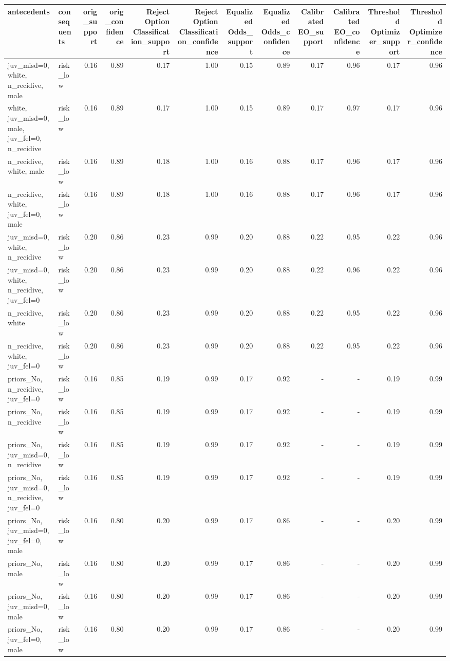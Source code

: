 \begin{tabular}{llrrrrrrrrrr}
\toprule
antecedents & consequents & orig\_support & orig\_confidence & Reject Option Classification\_support & Reject Option Classification\_confidence & Equalized Odds\_support & Equalized Odds\_confidence & Calibrated EO\_support & Calibrated EO\_confidence & Threshold Optimizer\_support & Threshold Optimizer\_confidence \\
\midrule
juv\_misd=0, white, n\_recidive, male & risk\_low & 0.16 & 0.89 & 0.17 & 1.00 & 0.15 & 0.89 & 0.17 & 0.96 & 0.17 & 0.96 \\
white, juv\_misd=0, male, juv\_fel=0, n\_recidive & risk\_low & 0.16 & 0.89 & 0.17 & 1.00 & 0.15 & 0.89 & 0.17 & 0.97 & 0.17 & 0.96 \\
n\_recidive, white, male & risk\_low & 0.16 & 0.89 & 0.18 & 1.00 & 0.16 & 0.88 & 0.17 & 0.96 & 0.17 & 0.96 \\
n\_recidive, white, juv\_fel=0, male & risk\_low & 0.16 & 0.89 & 0.18 & 1.00 & 0.16 & 0.88 & 0.17 & 0.96 & 0.17 & 0.96 \\
juv\_misd=0, white, n\_recidive & risk\_low & 0.20 & 0.86 & 0.23 & 0.99 & 0.20 & 0.88 & 0.22 & 0.95 & 0.22 & 0.96 \\
juv\_misd=0, white, n\_recidive, juv\_fel=0 & risk\_low & 0.20 & 0.86 & 0.23 & 0.99 & 0.20 & 0.88 & 0.22 & 0.96 & 0.22 & 0.96 \\
n\_recidive, white & risk\_low & 0.20 & 0.86 & 0.23 & 0.99 & 0.20 & 0.88 & 0.22 & 0.95 & 0.22 & 0.96 \\
n\_recidive, white, juv\_fel=0 & risk\_low & 0.20 & 0.86 & 0.23 & 0.99 & 0.20 & 0.88 & 0.22 & 0.95 & 0.22 & 0.96 \\
priors\_No, n\_recidive, juv\_fel=0 & risk\_low & 0.16 & 0.85 & 0.19 & 0.99 & 0.17 & 0.92 & - & - & 0.19 & 0.99 \\
priors\_No, n\_recidive & risk\_low & 0.16 & 0.85 & 0.19 & 0.99 & 0.17 & 0.92 & - & - & 0.19 & 0.99 \\
priors\_No, juv\_misd=0, n\_recidive & risk\_low & 0.16 & 0.85 & 0.19 & 0.99 & 0.17 & 0.92 & - & - & 0.19 & 0.99 \\
priors\_No, juv\_misd=0, n\_recidive, juv\_fel=0 & risk\_low & 0.16 & 0.85 & 0.19 & 0.99 & 0.17 & 0.92 & - & - & 0.19 & 0.99 \\
priors\_No, juv\_misd=0, juv\_fel=0, male & risk\_low & 0.16 & 0.80 & 0.20 & 0.99 & 0.17 & 0.86 & - & - & 0.20 & 0.99 \\
priors\_No, male & risk\_low & 0.16 & 0.80 & 0.20 & 0.99 & 0.17 & 0.86 & - & - & 0.20 & 0.99 \\
priors\_No, juv\_misd=0, male & risk\_low & 0.16 & 0.80 & 0.20 & 0.99 & 0.17 & 0.86 & - & - & 0.20 & 0.99 \\
priors\_No, juv\_fel=0, male & risk\_low & 0.16 & 0.80 & 0.20 & 0.99 & 0.17 & 0.86 & - & - & 0.20 & 0.99 \\
\bottomrule
\end{tabular}
